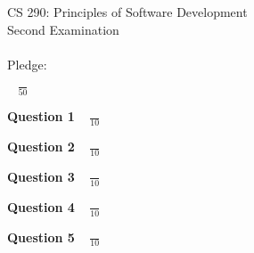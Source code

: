 \documentclass[12pt]{article}
\begin{document}
\vspace*{3in}

\begin{center}

CS 290: Principles of Software Development \\
Second Examination  \\ \mbox{} \\
Pledge: \\

\vspace*{.5in}

{\LARGE $\;\;\;\frac{}{50}$ }

\end{center}

\newpage

{\bf Question 1} {\Large $\;\;\;\frac{}{10}$ }

\newpage

{\bf Question 2} {\Large $\;\;\; \frac{}{10}$ }

\newpage

{\bf Question 3} {\Large $\;\;\; \frac{}{10}$ }

\newpage

{\bf Question 4} {\Large $\;\;\; \frac{}{10}$ }

\newpage

{\bf Question 5} {\Large $\;\;\; \frac{}{10}$ }
\end{document}

